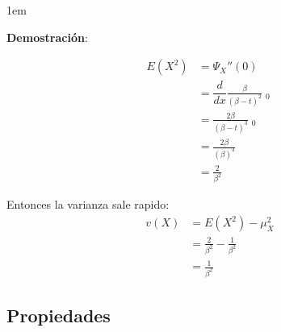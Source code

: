 \documentclass[12pt, fleqn]{report}                             %
\newenvironment{SmallIndentation}[1][0.75em]                    %
        {\begin{adjustwidth}{#1}{}\begin{footnotesize}}             %
        {\end{footnotesize}\end{adjustwidth}}                       %
\theoremstyle{break}                                            %
\newcommand \MiniDerivate[1][x] {\dfrac{d}{d #1}}               %
\DeclareMathOperator \Evaluate  {\Big|}                         %
\begin{document}
                \begin{SmallIndentation}[1em]
                    \textbf{Demostración}:
                    
                    \begin{align*}
                        E(X^2)
                            &= \Psi_X'' (0)                                             \\
                            &= \MiniDerivate \frac{\beta}{(\beta - t)^2} \Evaluate_0    \\
                            &= \frac{2\beta}{(\beta - t)^3} \Evaluate_0                 \\
                            &= \frac{2\beta}{(\beta)^3}                                 \\
                            &= \frac{2}{\beta^2}
                    \end{align*}

                    Entonces la varianza sale rapido:
                    \begin{align*}
                        v(X)
                            &= E(X^2) - \mu_X^2                                         \\
                            &= \frac{2}{\beta^2} - \frac{1}{\beta^2}                    \\
                            &= \frac{1}{\beta^2}
                    \end{align*}
                
                \end{SmallIndentation}




            \clearpage
            \subsection{Propiedades}
\end{document}
